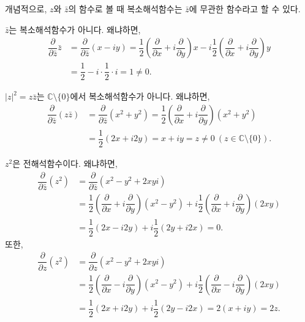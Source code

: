 개념적으로, $z$와 $\bar z$의 함수로 볼 때
복소해석함수는  $\bar z$에 무관한 함수라고 할 수 있다.

\begin{saltexample}[label=example-2-14]{}{}
$\bar z$는 복소해석함수가 아니다. 왜냐하면,
\begin{align*}
\dfrac{\partial}{\partial \bar z}\bar z 
&= \dfrac{\partial}{\partial \bar z} (x-iy)
= \dfrac 12 \left( \dfrac\partial {\partial x} + i \dfrac\partial {\partial y} \right) x
- i \dfrac 12 \left( \dfrac\partial {\partial x} + i \dfrac\partial {\partial y} \right) y \\
&= \dfrac 12 - i\cdot \dfrac12 \cdot i = 1 \ne 0.
\end{align*}
\end{saltexample}

\begin{saltexample}[label=example-2-15]{}{}
$|z|^2 = z\bar z$는 $\mathbb C\setminus \{0\}$에서 복소해석함수가 아니다. 왜냐하면,
\begin{align*}
\dfrac{\partial}{\partial \bar z}(z \bar z)
&= \dfrac{\partial}{\partial \bar z} (x^2+y^2)
= \dfrac12 \left( \dfrac\partial {\partial x} + i \dfrac\partial {\partial y} \right) (x^2+y^2) \\
&= \dfrac 12 (2x+i2y) = x+iy = z \ne 0 \ (z\in\mathbb C\setminus \{0\}).
\end{align*}
\end{saltexample}


\begin{saltexample}[label=example-2-16]{}{}
$z^2$은 전해석함수이다. 왜냐하면,
\begin{align*}
\dfrac{\partial}{\partial \bar z}(z^2)
&= \dfrac{\partial}{\partial \bar z} (x^2-y^2 + 2xyi) \\
&= \dfrac12 \left( \dfrac\partial {\partial x} + i \dfrac\partial {\partial y} \right) (x^2-y^2) 
+ i \dfrac12 \left( \dfrac\partial {\partial x} + i \dfrac\partial {\partial y} \right) (2xy)  \\
&= \dfrac 12 (2x-i2y) + i\dfrac12(2y+i2x) = 0.
\end{align*}
또한,
\begin{align*}
\dfrac{\partial}{\partial z}(z^2)
&= \dfrac{\partial}{\partial z} (x^2-y^2 + 2xyi) \\
&= \dfrac12 \left( \dfrac\partial {\partial x} - i \dfrac\partial {\partial y} \right) (x^2-y^2) 
+ i \dfrac12 \left( \dfrac\partial {\partial x} - i \dfrac\partial {\partial y} \right) (2xy)  \\
&= \dfrac 12 (2x+i2y) + i\dfrac12(2y-i2x) = 2(x+iy)=2z.
\end{align*}
\end{saltexample}

